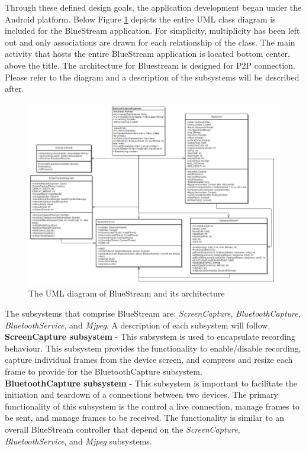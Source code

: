 \documentclass[a4paper,12pt]{article}
\begin{document}
Through these defined design goals, the application development began under the Android platform. Below Figure \ref{fig:UML} depicts the entire UML class diagram is included for the BlueStream application. For simplicity, multiplicity has been left out and only associations are drawn for each relationship of the class. The main activity that hosts the entire BlueStream application is located bottom center, above the title. The architecture for Bluestream is designed for P2P connection. Please refer to the diagram and a description of the subsystems will be described after.

\begin{figure}[h!]
\centering
\includegraphics[scale=.5]{Figures/Figure7.png}
\caption{The UML diagram of BlueStream and its architecture}
\label{fig:UML}
\end{figure}

The subsystems that comprise BlueStream are: \textit{ScreenCapture}, \textit{BluetoothCapture}, \textit{BluetoothService}, and \textit{Mjpeg}. A description of each subsystem will follow.\\

\noindent \textbf{ScreenCapture subsystem} - This subsystem is used to encapsulate recording behaviour. This subsystem provides the functionality to enable/disable recording, capture individual frames from the device screen, and compress and resize each frame to provide for the BluetoothCapture subsystem.\\

\noindent \textbf{BluetoothCapture subsystem} - This subsystem is important to facilitate the initiation and teardown of a connections between two devices. The primary functionality of this subsystem is the control a live connection, manage frames to be sent, and manage frames to be received. The functionality is similar to an overall BlueStream controller that depend on the \textit{ScreenCapture}, \textit{BluetoothService}, and \textit{Mjpeg} subsystems.\\
\end{document}
